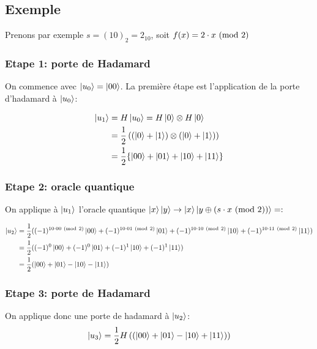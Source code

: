\subsection{Exemple}

Prenons par exemple $s=(10)_2 = 2_{10}$, soit $f(x) = 2 \cdot x \ (\mathrm{mod}\ 2)$
\subsubsection*{Etape 1: porte de Hadamard}

On commence avec $\ket{u_0} = \ket{00}$. La première étape est
l'application de la porte d'hadamard à $\ket{u_0}$:

\begin{align}
\ket{u_1} &= H\ket{u_0} = H\ket{0} \otimes H\ket{0} \\
& = \frac{1}{2} \left( (\ket{0} + \ket{1})\otimes(\ket{0} + \ket{1}) \right) \\
 & = \frac{1}{2}\{\ket{00} + \ket{01} + \ket{10} + \ket{11}\}
\end{align}


\subsubsection*{Etape 2: oracle quantique}

On applique à $\ket{u_1}$ l'oracle quantique $\ket{x}\ket{y}\rightarrow\ket{x}\ket{y\oplus (s \cdot x \ (\mathrm{mod}\ 2))} = :$

\begin{align*}
  \ket{u_2} &= \frac{1}{2}((-1)^{10 \cdot 00 \ (\mathrm{mod}\ 2)} \ket{00} + (-1)^{10 \cdot 01 \ (\mathrm{mod}\ 2)} \ket{01} + (-1)^{10 \cdot 10 \ (\mathrm{mod}\ 2)} \ket{10} + (-1)^{10 \cdot 11 \ (\mathrm{mod}\ 2)} \ket{11}) \\
  &= \frac{1}{2}((-1)^{0} \ket{00} + (-1)^{0} \ket{01} + (-1)^{1} \ket{10} + (-1)^{1} \ket{11}) \\
  &= \frac{1}{2} (\ket{00} + \ket{01} - \ket{10} - \ket{11})
\end{align*}

\subsubsection*{Etape 3: porte de Hadamard}

On applique donc une porte de hadamard à $\ket{u_2}$:
\begin{equation}
  \label{eq:5}
\ket{u_3} = \frac{1}{2} H \left( (\ket{00} + \ket{01} - \ket{10} + \ket{11}) \right) 
\end{equation}

